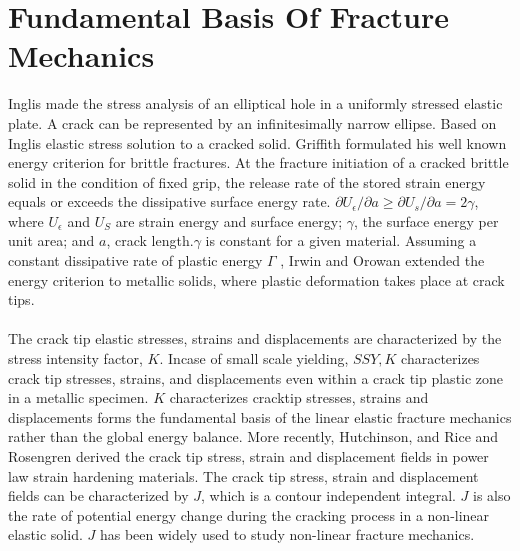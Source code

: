 \documentclass[12pt]{article}
\begin{document}
\section{Fundamental Basis Of Fracture Mechanics}
Inglis made the stress analysis of an elliptical hole in a uniformly stressed elastic plate. A crack can be 
represented by an infinitesimally narrow ellipse. Based on Inglis elastic stress solution to a cracked solid. 
Griffith formulated his well known energy criterion for brittle fractures. At the fracture initiation of a cracked brittle solid in the 
condition of fixed grip, the release rate of the stored strain energy equals or exceeds the dissipative surface energy rate.
\(\partial U_\epsilon / \partial a \geq \partial U_s / \partial a = 2 \gamma \), 
where $U_\epsilon$ and $U_S$ are strain energy and surface energy; $\gamma$,  the surface energy per unit area; and $a$, crack length.$\gamma$ 
is constant for a given material. Assuming a constant dissipative rate of plastic energy $\varGamma $ , 
Irwin and Orowan extended the energy criterion to metallic solids, where plastic deformation takes place at crack tips.
\\\\The crack tip elastic stresses, strains and displacements are characterized by the stress intensity factor, $K$.  
Incase of small scale yielding, $SSY, K$ characterizes crack tip stresses, strains, and displacements even within a 
crack tip plastic zone in a metallic specimen. $K$ characterizes cracktip
stresses, strains and displacements forms the fundamental basis of the linear elastic fracture mechanics rather than 
the global energy balance. More recently, Hutchinson, and Rice and Rosengren derived the crack tip stress, strain and 
displacement fields in power law strain hardening 
materials. The crack tip stress, strain and displacement 
fields can be characterized by $J$, which is a contour independent 
integral. $J$ is also the rate of potential energy change during 
the cracking process in a non-linear elastic solid. $J$ has been 
widely used to study non-linear fracture mechanics.
\end{document}
